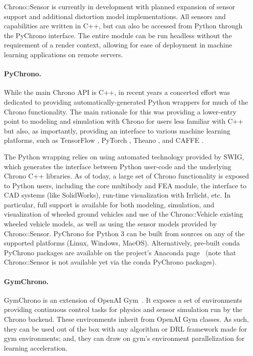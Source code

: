 \documentclass[12pt,twocolumn]{article}
\begin{document}
Chrono::Sensor is currently in development with planned expansion of sensor support and additional distortion model implementations. All sensors and capabilities are written in C++, but can also be accessed from Python through the PyChrono interface. The entire module can be run headless without the requirement of a render context, allowing for ease of deployment in machine learning applications on remote servers.


\paragraph{PyChrono.} While the main Chrono API is C++, in recent years a concerted effort was dedicated to providing automatically-generated Python wrappers for much of the Chrono functionality. The main rationale for this was providing a lower-entry point to modeling and simulation with Chrono for users less familiar with C++ but also, as importantly, providing an interface to various machine learning platforms, such as TensorFlow \cite{tensorflow}, PyTorch \cite{paszke2017PyTorch}, Theano \cite{theano2016}, and CAFFE \cite{caffe2014}.  

The Python wrapping relies on using automated technology provided by SWIG, which generates the interface between Python user-code and the underlying Chrono C++ libraries.  As of today, a large set of Chrono functionality is exposed to Python users, including the core multibody and FEA module, the interface to CAD systems (like SolidWorks), run-time visualization with Irrlicht, etc. In particular, full support is available for both modeling, simulation, and visualization of wheeled ground vehicles and use of the Chrono::Vehicle existing wheeled vehicle models, as well as using the sensor models provided by Chrono::Sensor. PyChrono for Python 3 can be built from sources on any of the supported platforms (Linux, Windows, MacOS).  Alternatively, pre-built conda PyChrono packages are available on the project's Anaconda page~\cite{pyChronoCondaWebSite} (note that Chrono::Sensor is not available yet via the conda PyChrono packages). 

\paragraph{GymChrono.} GymChrono is an extension of OpenAI Gym~\cite{Brockman16Gym}. It exposes a set of environments providing continuous control tasks for physics and sensor simulation run by the Chrono backend. These environments inherit from OpenAI Gym classes. As such, they can be used out of the box with any algorithm or DRL framework made for gym environments; and, they can draw on gym's environment parallelization for learning acceleration.
\end{document}
